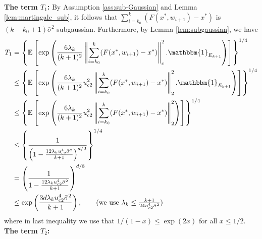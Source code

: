 \documentclass[letterpaper, 10 pt]{article}
\newcommand{\E}{\mathbb{E}}
\begin{document}
\textbf{The term $T_1$:} By Assumption \ref{ass:sub-Gaussian} and Lemma \ref{lem:martingale_sub}, it follows that $\sum_{i=k_0}^{k} ( F(x^*,w_{i+1}) - x^* )$ is $(k-k_0+1)\bar{\sigma}^2$-subgaussian. Furthermore, by Lemma \ref{lem:subgaussian}, we have
\begin{align*}
    T_1&=\left\{\E\left[ \exp\left(  \frac{6 \lambda_k}{ (k+1)^2} \left\| \sum\limits_{i=k_0}^{k} ( F(x^*,w_{i+1}) - x^* ) \right\|^2_c.\mathbbm{1}_{E_{k+1}}\right)\right]\right\}^{1/4} \\
    &\leq \left\{\E\left[ \exp\left(  \frac{6 \lambda_k}{ (k+1)^2}u_{c2}^2 \left\| \sum\limits_{i=k_0}^{k} ( F(x^*,w_{i+1}) - x^* ) \right\|^2_2.\mathbbm{1}_{E_{k+1}}\right)\right]\right\}^{1/4} \\
    &\leq \left\{\E\left[ \exp\left(  \frac{6 \lambda_k}{ (k+1)^2} u_{c2}^2\left\| \sum\limits_{i=k_0}^{k} ( F(x^*,w_{i+1}) - x^* ) \right\|^2_2\right)\right]\right\}^{1/4}\\ 
    &\leq \left\{\frac{1}{\left(1-\frac{12\lambda_ku_{c2}^4 \bar{\sigma}^2}{ k+1}\right)^{d/2}} \right\}^{1/4} \\
    &= \left(\frac{1}{1-\frac{12\lambda_k u_{c2}^4 \bar{\sigma}^2}{k+1}}\right)^{d/8} \\
    &\leq \exp\left(\frac{3d\lambda_k u_{c2}^4 \bar{\sigma}^2}{k+1}\right), \tag{we use $\lambda_k\leq \frac{k+1}{24 u_{c2}^4\bar{\sigma}^2}$}
\end{align*}
where in last inequality we use that $1/(1-x) \leq \exp(2x)$ for all $x\leq 1/2$.\\

\textbf{The term $T_2$:}
\end{document}
